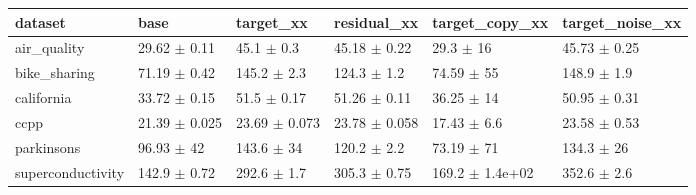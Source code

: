 \begin{tabular}{llllll}
\toprule
dataset & base & target\_xx & residual\_xx & target\_copy\_xx & target\_noise\_xx \\
\midrule
air\_quality & 29.62 $\pm$ 0.11 & 45.1 $\pm$ 0.3 & 45.18 $\pm$ 0.22 & 29.3 $\pm$ 16 & 45.73 $\pm$ 0.25 \\
bike\_sharing & 71.19 $\pm$ 0.42 & 145.2 $\pm$ 2.3 & 124.3 $\pm$ 1.2 & 74.59 $\pm$ 55 & 148.9 $\pm$ 1.9 \\
california & 33.72 $\pm$ 0.15 & 51.5 $\pm$ 0.17 & 51.26 $\pm$ 0.11 & 36.25 $\pm$ 14 & 50.95 $\pm$ 0.31 \\
ccpp & 21.39 $\pm$ 0.025 & 23.69 $\pm$ 0.073 & 23.78 $\pm$ 0.058 & 17.43 $\pm$ 6.6 & 23.58 $\pm$ 0.53 \\
parkinsons & 96.93 $\pm$ 42 & 143.6 $\pm$ 34 & 120.2 $\pm$ 2.2 & 73.19 $\pm$ 71 & 134.3 $\pm$ 26 \\
superconductivity & 142.9 $\pm$ 0.72 & 292.6 $\pm$ 1.7 & 305.3 $\pm$ 0.75 & 169.2 $\pm$ 1.4e+02 & 352.6 $\pm$ 2.6 \\
\bottomrule
\end{tabular}
